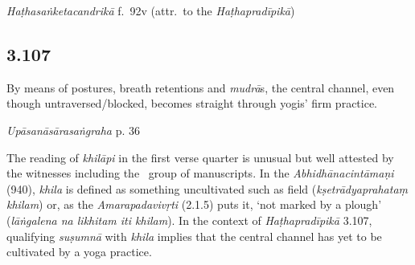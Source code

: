 \begin{ekdosis}
\begin{testimonia}[hp03_106]
\emph{Haṭhasaṅketacandrikā} f.~92v (attr.~to the \emph{Haṭhapradīpikā})
\begin{versinnote}
\end{versinnote}
\end{testimonia}



\subsection*{3.107}
\begin{translation}[hp03_107]
By means of postures, breath retentions and \emph{mudrā}s, the central channel, even though untraversed/blocked, becomes straight through yogis' firm practice.
\end{translation}


\begin{testimonia}[hp03_107]
\emph{Upāsanāsārasaṅgraha} p. 36 %
\begin{versinnote}
\end{versinnote}
\end{testimonia}

\begin{philcomm}[hp03_107]
The reading of \emph{khilāpi} in the first verse quarter is unusual but well attested by the witnesses including the \textalpha\ group of manuscripts. In the \emph{Abhidhānacintāmaṇi} (940), \emph{khila} is defined as something uncultivated such as field (\emph{kṣetrādyaprahataṃ khilam}) or, as the \emph{Amarapadavivṛti} (2.1.5) puts it, `not marked by a plough' (\emph{lāṅgalena na likhitam iti khilam}). In the context of \emph{Haṭhapradīpikā} 3.107, qualifying \emph{suṣumnā} with \emph{khila} implies that the central channel has yet to be cultivated by a yoga practice.



\end{philcomm}
\end{ekdosis}
